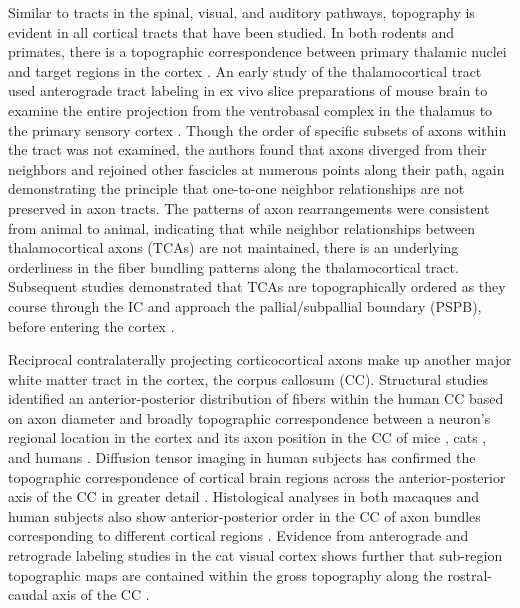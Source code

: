 Similar to tracts in the spinal, visual, and auditory pathways, topography is evident in all cortical tracts that have been studied. 
In both rodents and primates, there is a topographic correspondence between primary thalamic nuclei and target regions in the cortex \cite{caviness1980tangential,hohl1991topographical}. 
An early study of the thalamocortical tract used anterograde tract labeling in ex vivo slice preparations of mouse brain to examine the entire projection from the ventrobasal complex in the thalamus to the primary sensory cortex \cite{bernardo1987axonal}. 
Though the order of specific subsets of axons within the tract was not examined, the authors found that axons diverged from their neighbors and rejoined other fascicles at numerous points along their path, again demonstrating the principle that one-to-one neighbor relationships are not preserved in axon tracts.
The patterns of axon rearrangements were consistent from animal to animal, indicating that while neighbor relationships between thalamocortical axons (TCAs) are not maintained, there is an underlying orderliness in the fiber bundling patterns along the thalamocortical tract. 
Subsequent studies demonstrated that TCAs are topographically ordered as they course through the IC and approach the pallial/subpallial boundary (PSPB), before entering the cortex \cite{molnar1998mechanisms}.

Reciprocal contralaterally projecting corticocortical axons make up another major white matter tract in the cortex, the corpus callosum (CC). 
Structural studies identified an anterior-posterior distribution of fibers within the human CC based on axon diameter \cite{aboitiz1992fiber} and broadly topographic correspondence between a neuron’s regional location in the cortex and its axon position in the CC of mice \cite{ozaki1992prenatal}, cats \cite{nakamura1989topography}, and humans \cite{de1985topography}. 
Diffusion tensor imaging in human subjects has confirmed the topographic correspondence of cortical brain regions across the anterior-posterior axis of the CC in greater detail \cite{hofer2006topography}. 
Histological analyses in both macaques and human subjects also show anterior-posterior order in the CC of axon bundles corresponding to different cortical regions \cite{caminiti2013diameter}.
Evidence from anterograde and retrograde labeling studies in the cat visual cortex shows further that sub-region topographic maps are contained within the gross topography along the rostral-caudal axis of the CC \cite{payne1991visual}. 

